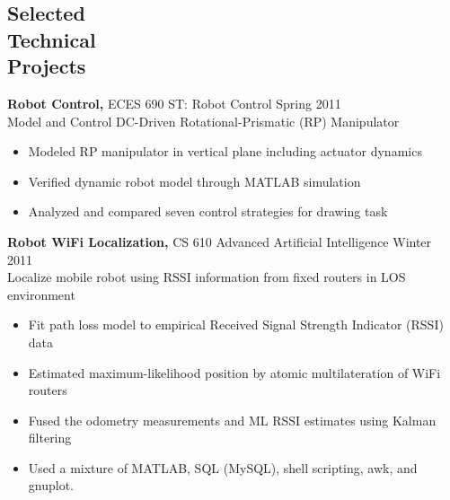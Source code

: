 \documentclass[margin]{res}
\begin{document}
\begin{resume}
\section{Selected \\ Technical \\ Projects}

{\bf Robot Control,} ECES 690 ST: Robot Control \hfill Spring 2011 \\
Model and Control DC-Driven Rotational-Prismatic (RP) Manipulator
\begin{itemize} \itemsep -2pt %
	\item Modeled RP manipulator in vertical plane including actuator dynamics
	\item Verified dynamic robot model through MATLAB simulation 
	\item Analyzed and compared seven control strategies for drawing task
\end{itemize}

{\bf Robot WiFi Localization,} CS 610 Advanced Artificial Intelligence \hfill Winter 2011 \\
Localize mobile robot using RSSI information from fixed routers in LOS environment
\begin{itemize} \itemsep -2pt %
\item Fit path loss model to empirical Received Signal Strength Indicator (RSSI) data
\item Estimated maximum-likelihood position by atomic multilateration of WiFi routers
\item Fused the odometry measurements and ML RSSI estimates using Kalman filtering
\item Used a mixture of MATLAB, SQL (MySQL), shell scripting, awk, and gnuplot.
\end{itemize}


\end{resume}
\end{document}
